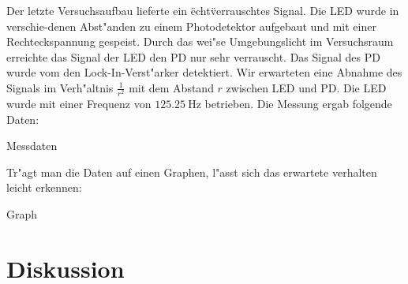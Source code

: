 \documentclass{scrartcl}
\begin{document}
			Der letzte Versuchsaufbau lieferte ein \"echt\" verrauschtes Signal.
			Die LED wurde in verschie-denen Abst"anden zu einem Photodetektor aufgebaut und mit einer Rechteckspannung gespeist.
			Durch das wei"se Umgebungslicht im Versuchsraum erreichte das Signal der LED den PD nur sehr verrauscht.
			Das Signal des PD wurde vom den Lock-In-Verst"arker detektiert.
			Wir erwarteten eine Abnahme des Signals im Verh"altnis $\frac{1}{r^2}$ mit dem Abstand $r$ zwischen LED und PD.
			Die LED wurde mit einer Frequenz von $\SI{125,25}{\hertz}$ betrieben. Die Messung ergab folgende Daten:


			Messdaten


			Tr"agt man die Daten auf einen Graphen, l"asst sich das erwartete verhalten leicht erkennen:


			Graph


	\section{Diskussion}
\end{document}
